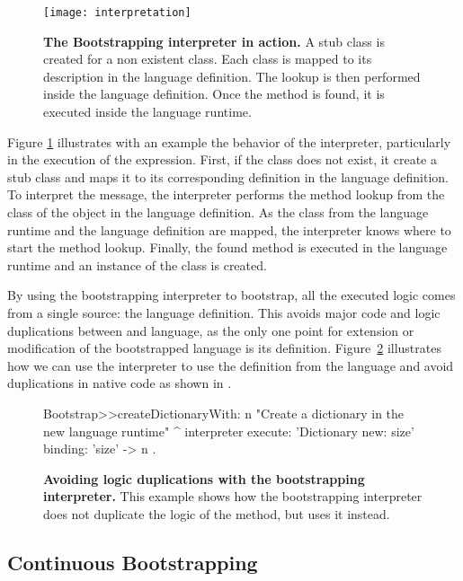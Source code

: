 \begin{figure}[!ht]
\center
\texttt{[image: interpretation]}
\caption{\textbf{The Bootstrapping interpreter in action.} A stub class is created for a non existent class. Each class is mapped to its description in the language definition. The lookup is then performed inside the language definition. Once the method is found, it is executed inside the language runtime.\label{fig:interpretation}}
\end{figure}

Figure \ref{fig:interpretation} illustrates with an example the behavior of the interpreter, particularly in the execution of the  expression. First, if the class  does not exist, it create a stub  class and maps it to its corresponding definition in the language definition. To interpret the  message, the interpreter performs the method lookup from the class of the object in the language definition. As the class from the language runtime and the language definition are mapped, the interpreter knows where to start the method lookup. Finally, the found method is executed in the language runtime and an instance of the  class is created.



By using the bootstrapping interpreter to bootstrap, all the executed logic comes from a single source: the language definition. This avoids  major code and logic duplications between \VM and language, as the only one point for extension or modification of the bootstrapped language is its definition. Figure~\ref{code:logic_dup3} illustrates how we can use the interpreter to use the  definition from the language and avoid duplications in native code as shown in .


\begin{figure}[ht]
\begin{code}
Bootstrap>>createDictionaryWith: n
    "Create a dictionary in the new language runtime"
    ^ interpreter
            execute: 'Dictionary new: size'
            binding: { 'size' -> n }.
\end{code}
\caption{\textbf{Avoiding logic duplications with the bootstrapping interpreter.} This example shows how the bootstrapping interpreter does not duplicate the logic of the  method, but uses it instead.\label{code:logic_dup3}}
\end{figure}


\subsection{Continuous Bootstrapping}\label{sec:continuous_bootstrapping}

